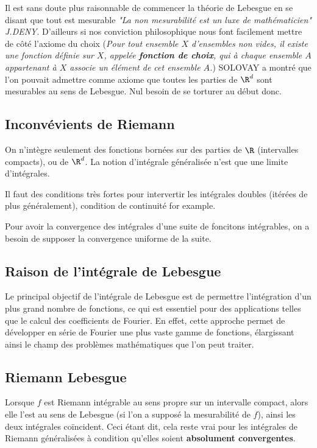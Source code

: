 Il est sans doute plus raisonnable de commencer la théorie de Lebesgue en se disant que tout est mesurable \textit{"La non mesurabilité est un luxe de mathématicien" J.DENY}. D'ailleurs si nos conviction philosophique nous font facilement mettre de côté l'axiome du choix (\textit{Pour tout ensemble $X$ d'ensembles non vides, il existe une fonction définie sur $X$, appelée \textbf{fonction de choix}, qui à chaque ensemble $A$ appartenant à $X$ associe un élément de cet ensemble $A$.}) SOLOVAY a montré que l'on pouvait admettre comme axiome que toutes les parties de $\R^d$ sont mesurables au sens de Lebesgue. Nul besoin de se torturer au début donc. 

\subsection*{Inconvévients de Riemann}
\ben
	\item On n'intègre seulement des fonctions bornées sur des parties de $\R$ (intervalles compacts), ou de $\R^d$. La notion d'intégrale généralisée n'est que une limite d'intégrales.
	\item Il faut des conditions très fortes pour intervertir les intégrales doubles (itérées de plus généralement), condition de continuité for example.
	\item Pour avoir la convergence des intégrales d'une suite de foncitons intégrables, on a besoin de supposer la convergence uniforme de la suite. 
\een

\subsection*{Raison de l'intégrale de Lebesgue}
Le principal objectif de l'intégrale de Lebesgue est de permettre l'intégration d'un plus grand nombre de fonctions, ce qui est essentiel pour des applications telles que le calcul des coefficients de Fourier. En effet, cette approche permet de développer en série de Fourier une plus vaste gamme de fonctions, élargissant ainsi le champ des problèmes mathématiques que l'on peut traiter.

\subsection*{Riemann  Lebesgue}
Lorsque $f$ est Riemann intégrable au sens propre sur un intervalle compact, alors elle l'est au sens de Lebesgue (si l'on a supposé la mesurabilité de $f$), ainsi les deux intégrales coïncident. Ceci étant dit, cela reste vrai pour les intégrales de Riemann généralisées à condition qu'elles soient \textbf{absolument convergentes}.

